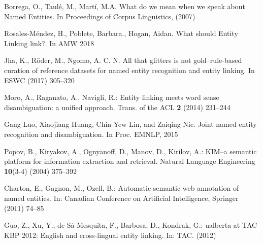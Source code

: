 \documentclass{llncs}
\begin{document}

\begin{thebibliography}{99}




Borrega, O., Taul\'e, M., Mart\'i, M.A. What do we mean when we speak about Named Entities. In Proceedings of Corpus Linguistics, (2007)

Rosales-M\'endez, H., Poblete, Barbara., Hogan, Aidan. What should Entity Linking link?. In AMW 2018

Jha, K., R\"oder, M., Ngomo, A. C. N. All that glitters is not gold–rule-based curation of reference datasets for named entity recognition and entity linking. In ESWC (2017) 305--320

Moro, A., Raganato, A., Navigli, R.: Entity linking meets word sense disambiguation: a unified approach. Trans. of the ACL \textbf{2} (2014) 231--244

Gang Luo, Xiaojiang Huang, Chin-Yew Lin, and Zaiqing Nie. Joint named entity recognition and disambiguation. In Proc. EMNLP, 2015



Popov, B., Kiryakov, A., Ognyanoff, D., Manov, D., Kirilov, A.: KIM--a semantic platform for information extraction and retrieval. Natural Language Engineering \textbf{10}(3-4) (2004) 375--392

Charton, E., Gagnon, M., Ozell, B.: Automatic semantic web annotation of named entities. In: Canadian Conference on Artificial Intelligence, Springer (2011) 74--85

Guo, Z., Xu, Y., de S{\'a} Mesquita, F., Barbosa, D., Kondrak, G.: ualberta at {TAC-KBP} 2012: English and cross-lingual entity linking. In: TAC. (2012)


\end{thebibliography}
\end{document}
